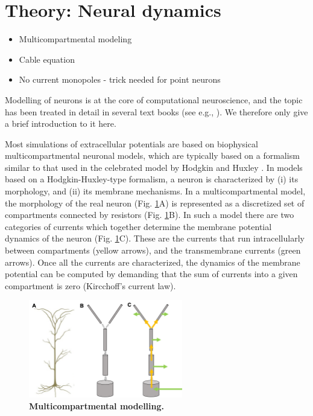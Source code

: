 \section{Theory: Neural dynamics}
\label{sec:NeuralDynamics}
\begin{itemize}
\item Multicompartmental modeling
\item Cable equation
\item No current monopoles - trick needed for point neurons
\end{itemize}

Modelling of neurons is at the core of computational neuroscience, and the topic has been treated in detail in several text books (see e.g., \cite{johnston1994foundations, KockSegev1998, Koch1999, Hille2001, Dayan2005, Sterratt2011}). We therefore only give a brief introduction to it here. 

Most simulations of extracellular potentials are based on biophysical multicompartmental neuronal models, which are typically based on a formalism similar to that used in the celebrated model by Hodgkin and Huxley \cite{Hodgkin1952}. In models based on
a Hodgkin-Huxley-type formalism, a neuron is characterized by (i) its morphology, and (ii) its membrane mechanisms. In a multicompartmental model, the morphology of the real neuron (Fig. \ref{fig:multicomp}A) is represented as a discretized set of compartments connected by resistors (Fig. \ref{fig:multicomp}B). In such a model there are two categories of currents which together determine the membrane potential dynamics of the neuron (Fig. \ref{fig:multicomp}C). These are the currents that run intracellularly between compartments (yellow arrows), and the transmembrane currents (green arrows). Once all the currents are characterized, the dynamics of the membrane potential can be computed by demanding that the sum of currents into a given compartment is zero (Kircchoff's current law). 

\begin{figure}[!ht]
\begin{center}
\includegraphics[width=0.6\textwidth]{Fig02/Multicomp.png}
\end{center}
\caption{\textbf{Multicompartmental modelling.} 
}
\label{fig:multicomp}
\end{figure}

